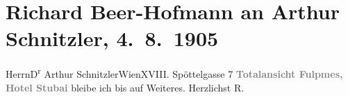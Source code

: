 

         \renewcommand{\erwaehnteOrte}{Orte: Edmund-Weiß-Gasse 7, Fulpmes, Grand Hotel Stubai, Wien}
         \renewcommand{\erwaehnteWerke}{}
               \section[Richard Beer-Hofmann an Arthur Schnitzler, 4. 8. 1905]{ Richard Beer-Hofmann an Arthur Schnitzler, 4. 8. 1905}\nopagebreak{}\rehead{ }\begin{ledgroupsized}[t]{13cm}\normalsize\beginnumbering \toendnotes[C]{\smallbreak\pagebreak[2]} 
\pstart{}{\pb}Herrn\pend{}\pstart{}D\textsuperscript{r} Arthur Schnitzler\pend{}\pstart{}Wien\pend{}\pstart{}XVIII. Spöttelgasse 7\pend{}{\bigskip}\pstart
           \noindent{}\centering{}{\pb}\textcolor{gray}{\textbf{Totalansicht Fulpmes, Hotel Stubai}}\pend
           \pstart
           \noindent{}bleibe ich bis auf Weiteres. Herzlichst \spacefill\mbox{R.}\pend
           
         
         \endnumbering{}\end{ledgroupsized}  \newcommand{\dateiname}{L01537}\newcommand{\titel}{Richard Beer-Hofmann an Arthur Schnitzler, 4. 8. 1905}\newcommand{\editorInnen}{Martin Anton Müller und Gerd-Hermann Susen}
      